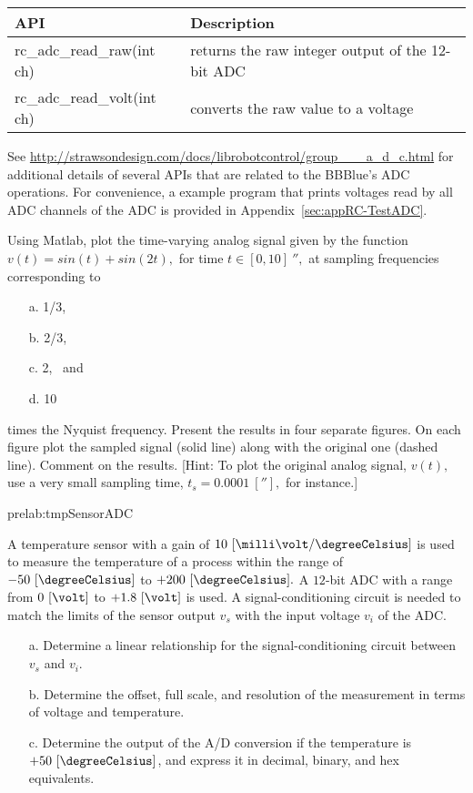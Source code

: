     \begin{center}
      \begin{tabular}{l|p{3.5in}}
        \toprule
        API & Description\\
        \toprule 
        rc\_adc\_read\_raw(int ch) & returns the raw integer output of the 12-bit ADC\\
        rc\_adc\_read\_volt(int ch) & converts the  raw value to a voltage\\
        \bottomrule
      \end{tabular}
\end{center}
%
See \url{http://strawsondesign.com/docs/librobotcontrol/group___a_d_c.html} for additional details of several APIs that are related to the BBBlue's ADC operations.   For convenience, a example program that prints voltages read by all ADC channels of the ADC is provided in Appendix~\ref{sec:appRC-TestADC}. 



\begin{prelab}
  
Using Matlab, plot the time-varying analog signal given by the function  $v(t) = sin(t) + sin(2t),$ for time $t\in [0,10]~\second,$ at sampling frequencies corresponding to
\begin{enumerate}
\item[a.] 1/3,
\item[b.] 2/3,
\item[c.] 2,~ and
\item[d.] 10
\end{enumerate}
times the Nyquist frequency. Present the results in four separate figures. On each figure plot the sampled signal (solid line) along with the original one (dashed line). Comment on the results.  [Hint: To plot the original analog signal, $v(t),$ use a very small sampling time, $t_s = 0.0001~[\second],$ for instance.]
\end{prelab}

\begin{prelab}{prelab:tmpSensorADC}

  
A temperature sensor with a gain of $10~[\milli\volt/\degreeCelsius]$ is used to measure the temperature of a process within the range of $-50~[\degreeCelsius]$ to $+200~[\degreeCelsius].$ A $12$-bit ADC with a range from $0~[\volt]$ to $+1.8~[\volt]$ is used. A signal-conditioning circuit is needed to match the limits of the sensor output $v_s$ with the input voltage $v_i$ of the ADC. 

\begin{itemize}
\item[a.] Determine a linear relationship for the signal-conditioning circuit between $v_s$ and $v_i$.
\item[b.] Determine the offset, full scale, and resolution of the measurement in terms of voltage and temperature.
\item[c.] Determine the output of the A/D conversion if the temperature is $+50~[\degreeCelsius]$, and express it in decimal, binary, and hex equivalents. 
\end{itemize}
\end{prelab}




